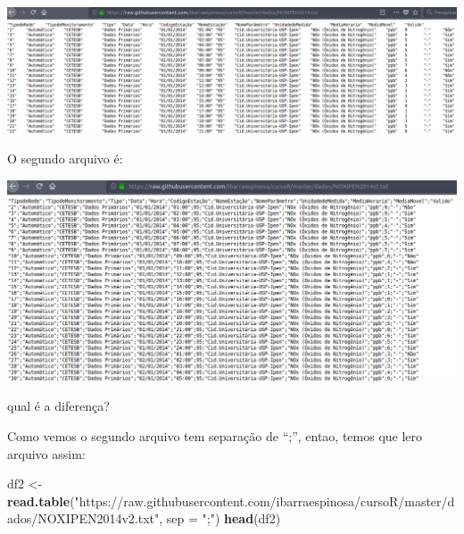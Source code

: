 \documentclass[]{book}
\newenvironment{Shaded}{\begin{snugshade}}{\end{snugshade}}
\newcommand{\KeywordTok}[1]{\textcolor[rgb]{0.13,0.29,0.53}{\textbf{#1}}}
\newcommand{\DataTypeTok}[1]{\textcolor[rgb]{0.13,0.29,0.53}{#1}}
\newcommand{\StringTok}[1]{\textcolor[rgb]{0.31,0.60,0.02}{#1}}
\newcommand{\NormalTok}[1]{#1}
\theoremstyle{definition}
\theoremstyle{definition}
\theoremstyle{definition}
\theoremstyle{remark}
\begin{document}
\includegraphics[width=18.47in]{figuras/f1}

O segundo arquivo é:

\includegraphics[width=15.33in]{figuras/f2}

qual é a diferença?

Como vemos o segundo arquivo tem separação de ``;'', entao, temos que
lero arquivo assim:

\begin{Shaded}
\begin{Highlighting}[]
\NormalTok{df2 <-}\StringTok{ }\KeywordTok{read.table}\NormalTok{(}\StringTok{"https://raw.githubusercontent.com/ibarraespinosa/cursoR/master/dados/NOXIPEN2014v2.txt"}\NormalTok{, }\DataTypeTok{sep =} \StringTok{";"}\NormalTok{)}
\KeywordTok{head}\NormalTok{(df2)}
\end{Highlighting}
\end{Shaded}
\end{document}
